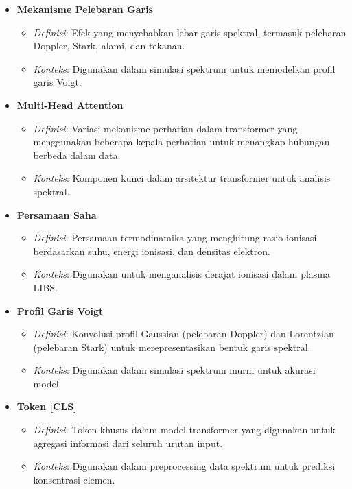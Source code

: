 \documentclass[a4paper,12pt]{article}
\begin{document}
\begin{itemize}
    \item \textbf{Mekanisme Pelebaran Garis}  
        \begin{itemize}
            \item \textit{Definisi}: Efek yang menyebabkan lebar garis spektral, termasuk pelebaran Doppler, Stark, alami, dan tekanan.
            \item \textit{Konteks}: Digunakan dalam simulasi spektrum untuk memodelkan profil garis Voigt.
        \end{itemize}

    \item \textbf{Multi-Head Attention}  
        \begin{itemize}
            \item \textit{Definisi}: Variasi mekanisme perhatian dalam transformer yang menggunakan beberapa kepala perhatian untuk menangkap hubungan berbeda dalam data.
            \item \textit{Konteks}: Komponen kunci dalam arsitektur transformer untuk analisis spektral.
        \end{itemize}

    \item \textbf{Persamaan Saha}  
        \begin{itemize}
            \item \textit{Definisi}: Persamaan termodinamika yang menghitung rasio ionisasi berdasarkan suhu, energi ionisasi, dan densitas elektron.
            \item \textit{Konteks}: Digunakan untuk menganalisis derajat ionisasi dalam plasma LIBS.
        \end{itemize}

    \item \textbf{Profil Garis Voigt}  
        \begin{itemize}
            \item \textit{Definisi}: Konvolusi profil Gaussian (pelebaran Doppler) dan Lorentzian (pelebaran Stark) untuk merepresentasikan bentuk garis spektral.
            \item \textit{Konteks}: Digunakan dalam simulasi spektrum murni untuk akurasi model.
        \end{itemize}

    \item \textbf{Token [CLS]}  
        \begin{itemize}
            \item \textit{Definisi}: Token khusus dalam model transformer yang digunakan untuk agregasi informasi dari seluruh urutan input.
            \item \textit{Konteks}: Digunakan dalam preprocessing data spektrum untuk prediksi konsentrasi elemen.
        \end{itemize}


\end{itemize}
\end{document}
